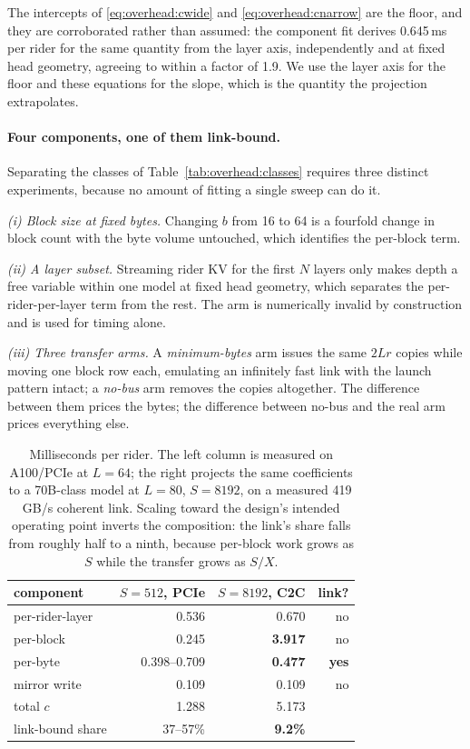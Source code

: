 The intercepts of \ref{eq:overhead:cwide} and \ref{eq:overhead:cnarrow} are the
floor, and they are corroborated rather than assumed: the component fit derives
0.645\,ms per rider for the same quantity from the layer axis, independently and
at fixed head geometry, agreeing to within a factor of 1.9. We use the layer
axis for the floor and these equations for the slope, which is the quantity the
projection extrapolates.

\paragraph{Four components, one of them link-bound.} Separating the classes of
Table~\ref{tab:overhead:classes} requires three distinct experiments, because no
amount of fitting a single sweep can do it.

\emph{(i) Block size at fixed bytes.} Changing $b$ from 16 to 64 is a fourfold
change in block count with the byte volume untouched, which identifies the
per-block term.

\emph{(ii) A layer subset.} Streaming rider KV for the first $N$ layers only
makes depth a free variable within one model at fixed head geometry, which
separates the per-rider-per-layer term from the rest. The arm is numerically
invalid by construction and is used for timing alone.

\emph{(iii) Three transfer arms.} A \emph{minimum-bytes} arm issues the same
$2Lr$ copies while moving one block row each, emulating an infinitely fast link
with the launch pattern intact; a \emph{no-bus} arm removes the copies
altogether. The difference between them prices the bytes; the difference between
no-bus and the real arm prices everything else.

\begin{table}[t]
\centering
\small
\begin{tabular}{@{}lrrr@{}}
\toprule
component & $S{=}512$, PCIe & $S{=}8192$, C2C & link? \\
\midrule
per-rider-layer & 0.536 & 0.670 & no \\
per-block       & 0.245 & \textbf{3.917} & no \\
per-byte        & 0.398--0.709 & \textbf{0.477} & \textbf{yes} \\
mirror write    & 0.109 & 0.109 & no \\
\midrule
total $c$       & 1.288 & 5.173 & \\
link-bound share & 37--57\% & \textbf{9.2\%} & \\
\bottomrule
\end{tabular}
\caption{Milliseconds per rider. The left column is measured on A100/PCIe at
$L{=}64$; the right projects the same coefficients to a 70B-class model at
$L{=}80$, $S{=}8192$, on a measured 419\,GB/s coherent link. Scaling toward the
design's intended operating point inverts the composition: the link's share
falls from roughly half to a ninth, because per-block work grows as $S$ while
the transfer grows as $S/X$.}
\label{tab:overhead:components}
\end{table}

